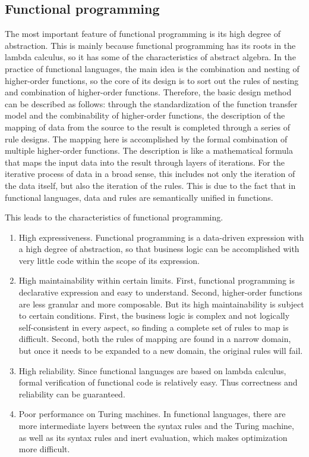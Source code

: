 \subsection{Functional programming}

The most important feature of functional programming is its high degree of abstraction. This is mainly because functional programming has its roots in the lambda calculus, so it has some of the characteristics of abstract algebra. In the practice of functional languages, the main idea is the combination and nesting of higher-order functions, so the core of its design is to sort out the rules of nesting and combination of higher-order functions. Therefore, the basic design method can be described as follows: through the standardization of the function transfer model and the combinability of higher-order functions, the description of the mapping of data from the source to the result is completed through a series of rule designs. The mapping here is accomplished by the formal combination of multiple higher-order functions. The description is like a mathematical formula that maps the input data into the result through layers of iterations. For the iterative process of data in a broad sense, this includes not only the iteration of the data itself, but also the iteration of the rules. This is due to the fact that in functional languages, data and rules are semantically unified in functions.

This leads to the characteristics of functional programming.

\begin{enumerate}
    \item High expressiveness. Functional programming is a data-driven expression with a high degree of abstraction, so that business logic can be accomplished with very little code within the scope of its expression.
    \item High maintainability within certain limits. First, functional programming is declarative expression and easy to understand. Second, higher-order functions are less granular and more composable. But its high maintainability is subject to certain conditions. First, the business logic is complex and not logically self-consistent in every aspect, so finding a complete set of rules to map is difficult. Second, both the rules of mapping are found in a narrow domain, but once it needs to be expanded to a new domain, the original rules will fail.
    \item High reliability. Since functional languages are based on lambda calculus, formal verification of functional code is relatively easy. Thus correctness and reliability can be guaranteed.
    \item Poor performance on Turing machines. In functional languages, there are more intermediate layers between the syntax rules and the Turing machine, as well as its syntax rules and inert evaluation, which makes optimization more difficult.
\end{enumerate}

